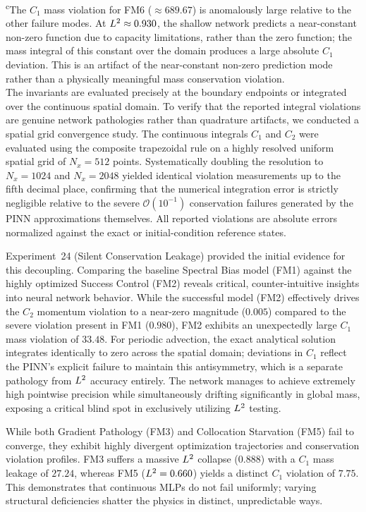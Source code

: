 \begin{table}[htpb]
\begin{flushleft}
    \textsuperscript{c}The $C_1$ mass violation for FM6 ($\approx 689.67$) is anomalously large relative to the other failure modes. At $L^2 \approx 0.930$, the shallow network predicts a near-constant non-zero function due to capacity limitations, rather than the zero function; the mass integral of this constant over the domain produces a large absolute $C_1$ deviation. This is an artifact of the near-constant non-zero prediction mode rather than a physically meaningful mass conservation violation.\\
    The invariants are evaluated precisely at the boundary endpoints or integrated over the continuous spatial domain. To verify that the reported integral violations are genuine network pathologies rather than quadrature artifacts, we conducted a spatial grid convergence study. The continuous integrals $C_1$ and $C_2$ were evaluated using the composite trapezoidal rule on a highly resolved uniform spatial grid of $N_x = 512$ points. Systematically doubling the resolution to $N_x = 1024$ and $N_x = 2048$ yielded identical violation measurements up to the fifth decimal place, confirming that the numerical integration error is strictly negligible relative to the severe $\mathcal{O}(10^{-1})$ conservation failures generated by the PINN approximations themselves. All reported violations are absolute errors normalized against the exact or initial-condition reference states.
    \end{flushleft}
\end{table}

Experiment~24 (Silent Conservation Leakage) provided the initial evidence for this decoupling. Comparing the baseline Spectral Bias model (FM1) against the highly optimized Success Control (FM2) reveals critical, counter-intuitive insights into neural network behavior. While the successful model (FM2) effectively drives the $C_2$ momentum violation to a near-zero magnitude ($0.005$) compared to the severe violation present in FM1 ($0.980$), FM2 exhibits an unexpectedly large $C_1$ mass violation of $33.48$. For periodic advection, the exact analytical solution integrates identically to zero across the spatial domain; deviations in $C_1$ reflect the PINN's explicit failure to maintain this antisymmetry, which is a separate pathology from $L^2$ accuracy entirely. The network manages to achieve extremely high pointwise precision while simultaneously drifting significantly in global mass, exposing a critical blind spot in exclusively utilizing $L^2$ testing.

While both Gradient Pathology (FM3) and Collocation Starvation (FM5) fail to converge, they exhibit highly divergent optimization trajectories and conservation violation profiles. FM3 suffers a massive $L^2$ collapse ($0.888$) with a $C_1$ mass leakage of $27.24$, whereas FM5 ($L^2 = 0.660$) yields a distinct $C_1$ violation of $7.75$. This demonstrates that continuous MLPs do not fail uniformly; varying structural deficiencies shatter the physics in distinct, unpredictable ways.

